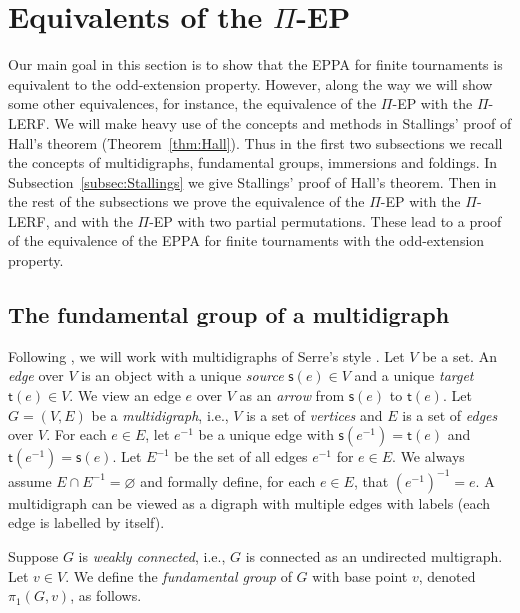 \documentclass[11pt]{amsart}
\theoremstyle{definition}
\theoremstyle{definition}
\numberwithin{equation}{section}
\begin{document}
\section{Equivalents of the $\Pi$-EP}
Our main goal in this section is to show that the EPPA for finite tournaments is equivalent to the odd-extension property. However, along the way we will show some other equivalences, for instance, the equivalence of the $\Pi$-EP with the $\Pi$-LERF. We will make heavy use of the concepts and methods in Stallings' proof \cite[Corollary 6.3]{St83} of Hall's theorem \cite{Ha49} (Theorem~\ref{thm:Hall}). Thus in the first two subsections we recall the concepts of multidigraphs, fundamental groups, immersions and foldings. In Subsection~\ref{subsec:Stallings} we give Stallings' proof of Hall's theorem. Then in the rest of the subsections we prove the equivalence of the $\Pi$-EP with the $\Pi$-LERF, and with the $\Pi$-EP with two partial permutations. These lead to a proof of the equivalence of the EPPA for finite tournaments with the odd-extension property. 




\subsection{The fundamental group of a multidigraph\label{subsec:multidigraph}} Following \cite{St83}, we will work with multidigraphs of Serre's style \cite{SerreBook}. Let $V$ be a set. An {\em edge} over $V$ is an object with a unique {\em source} $\mathsf{s}(e)\in V$ and a unique {\em target} $\mathsf{t}(e)\in V$. We view an edge $e$ over $V$ as an {\em arrow} from $\mathsf{s}(e)$ to $\mathsf{t}(e)$. Let $G=(V,E)$ be a {\em multidigraph}, i.e., $V$ is a set of {\em vertices} and $E$ is a set of {\em edges} over $V$.  For each $e\in E$, let $e^{-1}$ be a unique edge with $\mathsf{s}(e^{-1})=\mathsf{t}(e)$ and $\mathsf{t}(e^{-1})=\mathsf{s}(e)$. Let $E^{-1}$ be the set of all edges $e^{-1}$ for $e\in E$. We always assume $E\cap E^{-1}=\varnothing$ and formally define, for each $e\in E$, that $(e^{-1})^{-1}=e$. A multidigraph can be viewed as a digraph with multiple edges with labels (each edge is labelled by itself). 



Suppose $G$ is {\em weakly connected}, i.e., $G$ is connected as an undirected multigraph. Let $v\in V$. We define the {\em fundamental group} of $G$ with base point $v$, denoted $\pi_1(G, v)$, as follows. 
\end{document}
